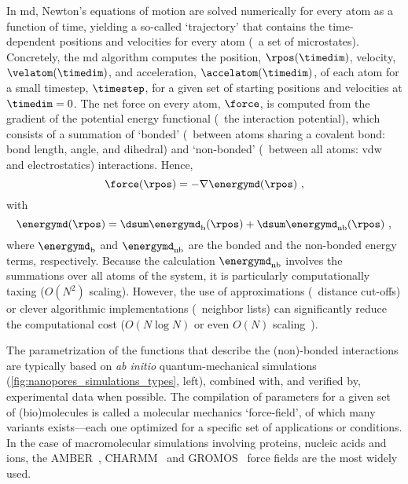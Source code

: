 In \gls{md}, Newton's equations of motion are solved numerically for every atom as a function of time,
yielding a so-called `trajectory' that contains the time-dependent positions and velocities for every atom
(\ie~a set of microstates). Concretely, the \gls{md} algorithm computes the position, $\rpos(\timedim)$,
velocity, $\velatom(\timedim)$, and acceleration, $\accelatom(\timedim)$, of each atom for a small
timestep\footnotemark, $\timestep$, for a given set of starting positions and velocities at $\timedim = 0$.%
%
%
The net force on every atom, $\force$, is computed from the gradient of the potential energy functional
(\ie~the interaction potential), which consists of a summation of `bonded' (\ie~between atoms sharing a
covalent bond: bond length, angle, and dihedral) and `non-bonded' (\ie~between all atoms: \gls{vdw} and
electrostatics) interactions. Hence,
%
\begin{equation}\label{eq:nanopores_md_force}
  \force (\rpos) = - \nabla \energymd (\rpos)
  \text{ ,}
\end{equation}
%
with
%
\begin{equation}\label{eq:nanopores_md_energy}
  \energymd (\rpos) = \dsum \energymd_{\text{b}} (\rpos) + \dsum \energymd_{\text{nb}} (\rpos)
  \text{ ,}
\end{equation}
%
where $\energymd_{\text{b}}$ and $\energymd_{\text{nb}}$ are the bonded and the non-bonded energy terms,
respectively. Because the calculation $\energymd_{\text{nb}}$ involves the summations over all atoms of the
system, it is particularly computationally taxing ($O(N^2)$ scaling). However, the use of approximations
(\eg~distance cut-offs) or clever algorithmic implementations (\eg~neighbor lists) can significantly reduce
the computational cost ($O(N\log N)$ or even $O(N)$ scaling~\cite{Eastman-2010}).

The parametrization of the functions that describe the (non)-bonded interactions are typically based on
\textit{ab initio} quantum-mechanical simulations (\cref{fig:nanopores_simulations_types}, left), combined
with, and verified by, experimental data when possible. The compilation of parameters for a given set of
(bio)molecules is called a molecular mechanics `force-field', of which many variants exists---each one
optimized for a specific set of applications or conditions. In the case of macromolecular simulations
involving proteins, nucleic acids and ions, the {AMBER}~\cite{Ponder-2003}, {CHARMM}~\cite{Huang-2016} and
{GROMOS}~\cite{Oostenbrink-2004} force fields are the most widely used.

